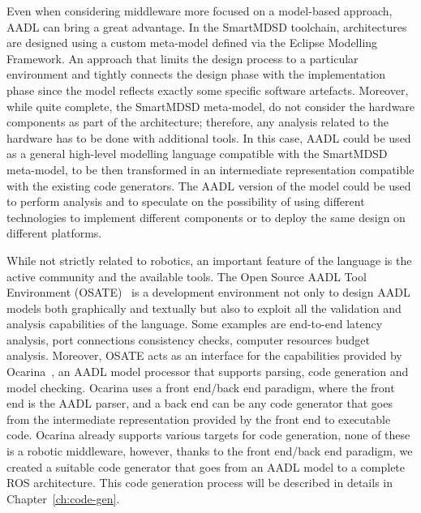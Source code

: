 Even when considering middleware more focused on a model-based approach, AADL can bring a great advantage. In the SmartMDSD toolchain, architectures are designed using a custom meta-model defined via the Eclipse Modelling Framework. An approach that limits the design process to a particular environment and tightly connects the design phase with the implementation phase since the model reflects exactly some specific software artefacts. Moreover, while quite complete, the SmartMDSD meta-model, do not consider the hardware components as part of the architecture; therefore, any analysis related to the hardware has to be done with additional tools. In this case, AADL could be used as a general high-level modelling language compatible with the SmartMDSD meta-model, to be then transformed in an intermediate representation compatible with the existing code generators. The AADL version of the model could be used to perform analysis and to speculate on the possibility of using different technologies to implement different components or to deploy the same design on different platforms.

While not strictly related to robotics, an important feature of the language is the active community and the available tools. The Open Source AADL Tool Environment (OSATE)~\cite{feiler2004open} is a development environment not only to design AADL models both graphically and textually but also to exploit all the validation and analysis capabilities of the language. Some examples are end-to-end latency analysis, port connections consistency checks, computer resources budget analysis. Moreover, OSATE acts as an interface for the capabilities provided by Ocarina~\cite{hugues2008prototype}, an AADL model processor that supports parsing, code generation and model checking. Ocarina uses a front end/back end paradigm, where the front end is the AADL parser, and a back end can be any code generator that goes from the intermediate representation provided by the front end to executable code. Ocarina already supports various targets for code generation, none of these is a robotic middleware, however, thanks to the front end/back end paradigm, we created a suitable code generator that goes from an AADL model to a complete ROS architecture. This code generation process will be described in details in Chapter~\ref{ch:code-gen}.

